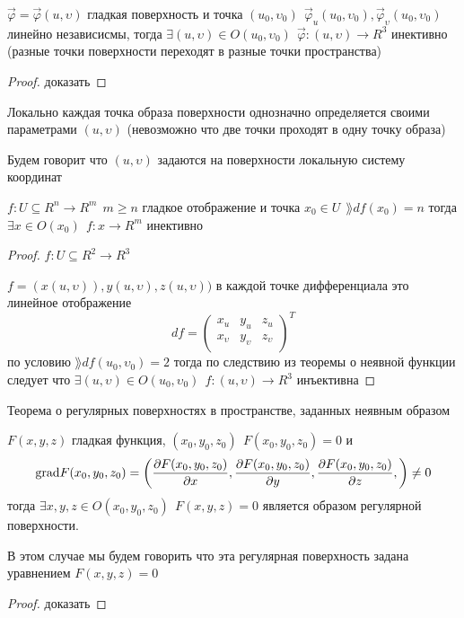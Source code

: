 \begin{theorem}
  $\vec \varphi = \vec \varphi(u, \upsilon)$ гладкая поверхность и точка
  $(u_0, \upsilon_0) ~~ \vec \varphi_u (u_0, \upsilon_0),
  \vec \varphi_{\upsilon} (u_0, \upsilon_0)$ линейно независисмы, тогда
  $\exists (u, \upsilon) \in O(u_0, \upsilon_0) ~~ \vec \varphi : (u, \upsilon)
  \to R^3$ инективно (разные точки поверхности переходят в разные точки
  пространства)
\end{theorem}

\begin{proof}
  доказать
\end{proof}

\begin{block}[Следствие]
  Локально каждая точка образа поверхности однозначно определяется своими
  параметрами $(u, \upsilon)$ (невозможно что две точки проходят в одну точку
  образа)

  Будем говорит что $(u, \upsilon)$ задаются на поверхности локальную систему
  координат
\end{block}

\begin{theorem}
  $f: U \subseteq R^n \to R^m ~~ m \ge n$ гладкое отображение и точка
  $x_0 \in U ~~ \rang df(x_0) = n$ тогда $\exists x \in O(x_0) ~~
  f: x \to R^m$ инективно
\end{theorem}

\begin{proof}
  $f: U \subseteq R^2 \to R^3$

  $f = (x(u, \upsilon)), y(u, \upsilon), z(u, \upsilon))$ в каждой точке
  дифференциала это линейное отображение
  $$
  df =
  \left(
  \begin{array}{ccc}
    x_u & y_u & z_u \\
    x_{\upsilon} & y_{\upsilon} & z_{\upsilon} \\
  \end{array}
  \right)^T
  $$
  по условию $\rang df(u_0, \upsilon_0) = 2$ тогда по следствию из теоремы о
  неявной функции следует что $\exists (u, \upsilon) \in O(u_0, \upsilon_0) ~~
  f: (u, \upsilon) \to R^3$ инъективна
\end{proof}

\begin{title}[\Large]
  Теорема о регулярных поверхностях в пространстве, заданных неявным образом
\end{title}

\begin{theorem}
  $F(x,y,z)$ гладкая функция, $(x_0, y_0, z_0) ~~ F(x_0, y_0, z_0) = 0$ и
  $$
  \mathrm{grad} F(x_0, y_0, z_0) = \left(
  \frac{\partial F(x_0, y_0, z_0)}{\partial x},
  \frac{\partial F(x_0, y_0, z_0)}{\partial y},
  \frac{\partial F(x_0, y_0, z_0)}{\partial z},
  \right) \not= 0
  $$
  тогда $\exists x,y,z \in O(x_0, y_0, z_0) ~~ F(x, y, z) = 0$ является образом
  регулярной поверхности.

  В этом случае мы будем говорить что эта регулярная поверхность задана
  уравнением $F(x, y, z) = 0$
\end{theorem}

\begin{proof}
  доказать
\end{proof}